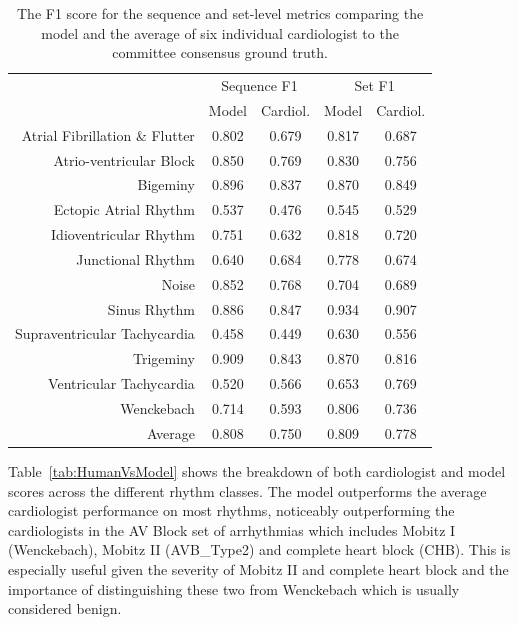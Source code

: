 \begin{table}
\centering
\begin{tabular}{r c c c c}
\toprule
    & \multicolumn{2}{c}{Sequence F1} & \multicolumn{2}{c}{Set F1} \\
\cmidrule{2-5}
 & Model & Cardiol. & Model & Cardiol. \\
\midrule
Atrial Fibrillation \& Flutter & 0.802 & 0.679 & 0.817 & 0.687 \\
Atrio-ventricular Block        & 0.850 & 0.769 & 0.830 & 0.756 \\
Bigeminy                       & 0.896 & 0.837 & 0.870 & 0.849 \\
Ectopic Atrial Rhythm          & 0.537 & 0.476 & 0.545 & 0.529 \\
Idioventricular Rhythm         & 0.751 & 0.632 & 0.818 & 0.720 \\
Junctional Rhythm              & 0.640 & 0.684 & 0.778 & 0.674 \\
Noise                          & 0.852 & 0.768 & 0.704 & 0.689 \\
Sinus Rhythm                   & 0.886 & 0.847 & 0.934 & 0.907 \\
Supraventricular Tachycardia   & 0.458 & 0.449 & 0.630 & 0.556 \\
Trigeminy                      & 0.909 & 0.843 & 0.870 & 0.816 \\
Ventricular Tachycardia        & 0.520 & 0.566 & 0.653 & 0.769 \\
Wenckebach                     & 0.714 & 0.593 & 0.806 & 0.736 \\
\midrule
Average	                       & 0.808 & 0.750 & 0.809 & 0.778 \\
\bottomrule
\end{tabular}
\caption{The F1 score for the sequence and set-level metrics comparing the
         model and the average of six individual cardiologist to the committee
         consensus ground truth.}
\label{tab:arrhythmias:model_cardiologist_f1}
\end{table}

Table~\ref{tab:HumanVsModel} shows the breakdown of both cardiologist and model
scores across the different rhythm classes. The model outperforms the average
cardiologist performance on most rhythms, noticeably outperforming the
cardiologists in the AV Block set of arrhythmias which includes Mobitz I
(Wenckebach), Mobitz II (AVB\_Type2) and complete heart block (CHB). This is
especially useful given the severity of Mobitz II and complete heart block and
the importance of distinguishing these two from Wenckebach which is usually
considered benign.

